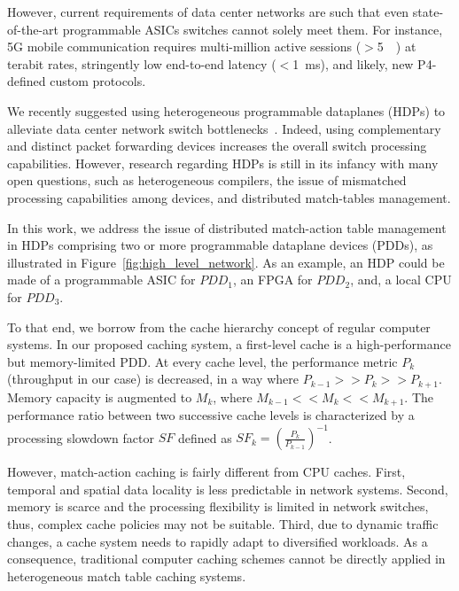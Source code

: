 However, current requirements of data center networks are such that even state-of-the-art programmable ASICs switches cannot solely meet them.
For instance, 5G mobile communication requires multi-million active sessions ($>$\SI{5}{\mega\nothing}) at terabit rates, stringently low end-to-end latency ($<$\SI{1}{\milli\second}), and likely, new P4-defined custom protocols.

We recently suggested using heterogeneous programmable dataplanes (HDPs) to alleviate data center network switch bottlenecks~\cite{p4eu:18}.
Indeed, using complementary and distinct packet forwarding devices increases the overall switch processing capabilities.
However, research regarding HDPs is still in its infancy with many open questions, such as heterogeneous compilers, the issue of mismatched processing capabilities among devices, and distributed match-tables management.

In this work, we address the issue of distributed match-action table management in HDPs comprising two or more programmable dataplane devices (PDDs), as illustrated in Figure~\ref{fig:high_level_network}.
As an example, an HDP could be made of a programmable ASIC for $PDD_1$, an  FPGA for $PDD_2$, and, a local CPU for $PDD_3$.


To that end, we borrow from the cache hierarchy concept of regular computer systems.
In our proposed caching system, a first-level cache is a high-performance but memory-limited PDD.
At every cache level, the performance metric $P_{k}$ (throughput in our case) is decreased, in a way where $P_{k-1} >> P_{k} >> P_{k+1}$.
Memory capacity is augmented to $M_{k}$, where $M_{k-1} << M_{k} << M_{k+1}$. 
The performance ratio between two successive cache levels is characterized by a processing slowdown factor $SF$ defined as $SF_{k} = \left(\frac{P_{k}}{P_{k-1}}\right)^{-1}$.


However, match-action caching is fairly different from CPU caches.
First, temporal and spatial data locality is less predictable in network systems.
Second, memory is scarce and the processing flexibility is limited in network switches, thus, complex cache policies may not be suitable.
Third, due to dynamic traffic changes, a cache system needs to rapidly adapt to diversified workloads.
As a consequence, traditional computer caching schemes cannot be directly applied in heterogeneous match table caching systems. 

